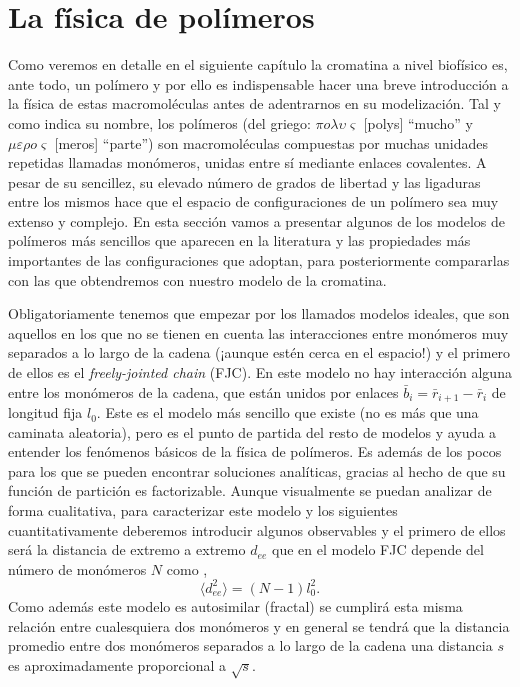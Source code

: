 \section{La física de polímeros}

Como veremos en detalle en el siguiente capítulo la cromatina a nivel biofísico es, ante todo, un polímero y por ello es indispensable hacer una breve introducción a la física de estas macromoléculas antes de adentrarnos en su modelización. Tal y como indica su nombre, los polímeros (del griego: $\pi o \lambda \upsilon \varsigma$ [polys] ``mucho'' y $\mu \varepsilon \rho o \varsigma$ [meros] ``parte'') son macromoléculas compuestas por muchas unidades repetidas llamadas monómeros, unidas entre sí mediante enlaces covalentes. A pesar de su sencillez, su elevado número de grados de libertad y las ligaduras entre los mismos hace que el espacio de configuraciones de un polímero sea muy extenso y complejo. En esta sección vamos a presentar algunos de los modelos de polímeros más sencillos que aparecen en la literatura y las propiedades más importantes de las configuraciones que adoptan, para posteriormente compararlas con las que obtendremos con nuestro modelo de la cromatina.

Obligatoriamente tenemos que empezar por los llamados modelos ideales, que son aquellos en los que no se tienen en cuenta las interacciones entre monómeros muy separados a lo largo de la cadena (¡aunque estén cerca en el espacio!) y el primero de ellos es el \textit{freely-jointed chain} (FJC). En este modelo no hay interacción alguna entre los monómeros de la cadena, que están unidos por enlaces $\bar{b}_i=\bar{r}_{i+1}-\bar{r}_i$ de longitud fija $l_0$. Este es el modelo más sencillo que existe (no es más que una caminata aleatoria), pero es el punto de partida del resto de modelos y ayuda a entender los fenómenos básicos de la física de polímeros. Es además de los pocos para los que se pueden encontrar soluciones analíticas, gracias al hecho de que su función de partición es factorizable. Aunque visualmente se puedan analizar de forma cualitativa, para caracterizar este modelo y los siguientes cuantitativamente deberemos introducir algunos observables y el primero de ellos será la distancia de extremo a extremo $d_{ee}$ que en el modelo FJC depende del número de monómeros $N$ como \cite{Theodorakopoulos2019},
\begin{equation}
    \label{eq:FJC_dee}
    \langle d_{ee}^2 \rangle=(N-1)l_0^2.
\end{equation}
Como además este modelo es autosimilar (fractal) se cumplirá esta misma relación entre cualesquiera dos monómeros y en general se tendrá que la distancia promedio entre dos monómeros separados a lo largo de la cadena una distancia $s$ es aproximadamente proporcional a $\sqrt{s}$.

